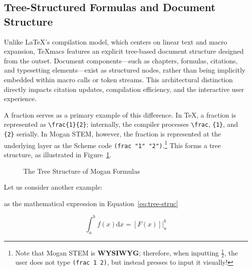 \subsection{Tree-Structured Formulas and Document Structure}
\label{sec:tree-struc-on-mogan}

Unlike \LaTeX{}'s compilation model, which centers on linear text and macro expansion, TeXmacs features an explicit tree-based document structure designed from the outset. Document components---such as chapters, formulas, citations, and typesetting elements---exist as structured nodes, rather than being implicitly embedded within macro calls or token streams. This architectural distinction directly impacts citation updates, compilation efficiency, and the interactive user experience.

A fraction serves as a primary example of this difference. In \TeX{}, a fraction is represented as \verb|\frac{1}{2}|; internally, the compiler processes \verb|\frac|, \verb|{1}|, and \verb|{2}| serially. In Mogan STEM, however, the fraction is represented at the underlying layer as the Scheme code \verb|(frac "1" "2")|.\footnote{Note that Mogan STEM is \textbf{WYSIWYG}; therefore, when inputting $\frac{1}{2}$, the user does not type \texttt{(frac 1 2)}, but instead presses  to input it visually!} This forms a tree structure, as illustrated in Figure~\ref{fig:frac-tree}.

\begin{figure}[htbp]
    \centering
    \caption{The Tree Structure of Mogan Formulas}
    \label{fig:frac-tree}
\end{figure}

Let us consider another example:

\begin{example}\label{exa:around-in-mogan}
    as the mathematical expression in Equation~\eqref{eq:tree-struc}

    \begin{equation}
        \label{eq:tree-struc}
        \int_{a}^{b} f(x) \mathrm{d}x = \left[ F(x) \right] \big|_{a}^{b}
    \end{equation}
\end{example}

